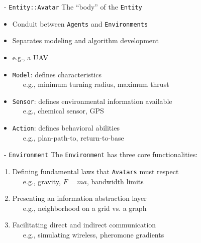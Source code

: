 
\begin{slide}{\SWEEP~- \texttt{Entity::Avatar}}
  The ``body'' of the \texttt{Entity}
  \begin{itemize}
  \item Conduit between \texttt{Agents} and \texttt{Environments}
  \item Separates modeling and algorithm development
  \item e.g., a UAV
    \bigskip
  \item 
    \texttt{Model}: defines characteristics \\
    ~~~e.g., minimum turning radius, maximum thrust
  \item 
    \texttt{Sensor}: defines environmental information available\\
    ~~~e.g., chemical sensor, GPS
  \item 
    \texttt{Action}: defines behavioral abilities\\
    ~~~e.g., plan-path-to, return-to-base
  \end{itemize}
\end{slide}


\begin{slide}{\SWEEP~- \texttt{Environment}}
  The \texttt{Environment} has three core functionalities:
  \bigskip
  \begin{enumerate}
    \itemsep=3.5ex
  \item Defining fundamental laws that \texttt{Avatars} must respect\\
    ~~~e.g., gravity, $F=ma$, bandwidth limits
    
  \item Presenting an information abstraction layer\\
    ~~~e.g., neighborhood on a grid vs. a graph
    
  \item Facilitating direct and indirect communication\\
    ~~~e.g., simulating wireless, pheromone gradients
  \end{enumerate}
\end{slide}


